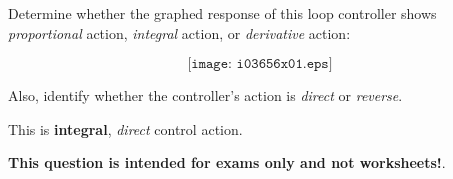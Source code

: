 

Determine whether the graphed response of this loop controller shows {\it proportional} action, {\it integral} action, or {\it derivative} action:

$$\texttt{[image: i03656x01.eps]}$$

Also, identify whether the controller's action is {\it direct} or {\it reverse}.







This is {\bf integral}, {\it direct} control action.







{\bf This question is intended for exams only and not worksheets!}.


